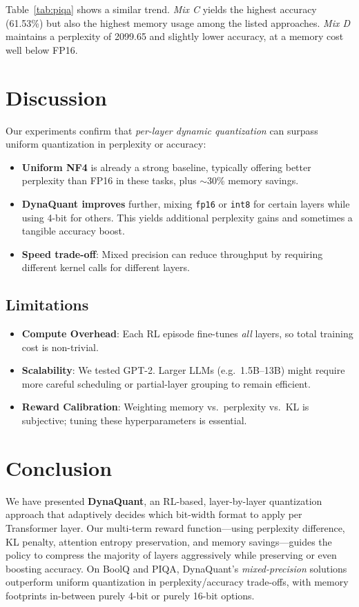 \documentclass{article}
\begin{document}
	Table~\ref{tab:piqa} shows a similar trend. \emph{Mix C} yields the highest accuracy (61.53\%) but also the highest memory usage among the listed approaches. \emph{Mix D} maintains a perplexity of 2099.65 and slightly lower accuracy, at a memory cost well below FP16. 
	
	\section{Discussion}
	\label{sec:discussion}
	Our experiments confirm that \emph{per-layer dynamic quantization} can surpass uniform quantization in perplexity or accuracy:
	\begin{itemize}
		\item \textbf{Uniform NF4} is already a strong baseline, typically offering better perplexity than FP16 in these tasks, plus $\sim$30\% memory savings.
		\item \textbf{DynaQuant improves} further, mixing \texttt{fp16} or \texttt{int8} for certain layers while using 4-bit for others. This yields additional perplexity gains and sometimes a tangible accuracy boost.
		\item \textbf{Speed trade-off}: Mixed precision can reduce throughput by requiring different kernel calls for different layers. 
	\end{itemize}
	
	\subsection{Limitations}
	\begin{itemize}
		\item \textbf{Compute Overhead}: Each RL episode fine-tunes \emph{all} layers, so total training cost is non-trivial.
		\item \textbf{Scalability}: We tested GPT-2. Larger LLMs (e.g.\ 1.5B–13B) might require more careful scheduling or partial-layer grouping to remain efficient.
		\item \textbf{Reward Calibration}: Weighting memory vs.\ perplexity vs.\ KL is subjective; tuning these hyperparameters is essential.
	\end{itemize}
	
	\section{Conclusion}
	We have presented \textbf{DynaQuant}, an RL-based, layer-by-layer quantization approach that adaptively decides which bit-width format to apply per Transformer layer. Our multi-term reward function---using perplexity difference, KL penalty, attention entropy preservation, and memory savings---guides the policy to compress the majority of layers aggressively while preserving or even boosting accuracy. On BoolQ and PIQA, DynaQuant’s \emph{mixed-precision} solutions outperform uniform quantization in perplexity/accuracy trade-offs, with memory footprints in-between purely 4-bit or purely 16-bit options.  
	
\end{document}
